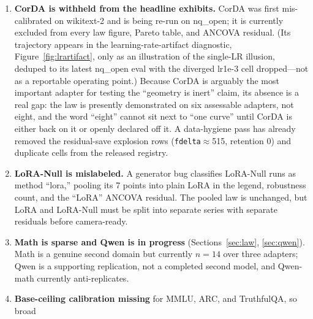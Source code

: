 \documentclass[11pt]{article}
\begin{document}
\begin{enumerate}
        ``fancy adapters forget more'' language stays out, and the SC-LoRA deviation
        remains provisional.
  \item \textbf{CorDA is withheld from the headline exhibits.} CorDA was first
        mis-calibrated on wikitext-2 and is being re-run on nq\_open; it is currently
        excluded from every law figure, Pareto table, and ANCOVA residual. (Its trajectory
        appears in the learning-rate-artifact diagnostic, Figure~\ref{fig:lrartifact}, only
        as an illustration of the single-LR illusion, deduped to its latest nq\_open eval
        with the diverged lr1e-3 cell dropped---not as a reportable operating point.)
        Because CorDA is arguably the most important adapter for testing the ``geometry is
        inert'' claim, its absence is a real gap: the law is presently demonstrated on six
        assessable adapters, not eight, and the word ``eight'' cannot sit next to ``one
        curve'' until CorDA is either back on it or openly declared off it. A data-hygiene
        pass has already removed the residual-save explosion rows (\texttt{fdelta}$\approx$515,
        retention 0) and duplicate cells from the released registry.
  \item \textbf{LoRA-Null is mislabeled.} A generator bug classifies LoRA-Null runs as
        method ``lora,'' pooling its 7 points into plain LoRA in the legend, robustness
        count, and the ``LoRA'' ANCOVA residual. The pooled law is unchanged, but LoRA and
        LoRA-Null must be split into separate series with separate residuals before
        camera-ready.
  \item \textbf{Math is sparse and Qwen is in progress} (Sections~\ref{sec:law},
        \ref{sec:qwen}). Math is a genuine second domain but currently $n\!=\!14$ over
        three adapters; Qwen is a supporting replication, not a completed second model, and
        Qwen-math currently anti-replicates.
  \item \textbf{Base-ceiling calibration missing} for MMLU, ARC, and TruthfulQA, so broad

\end{enumerate}
\end{document}
